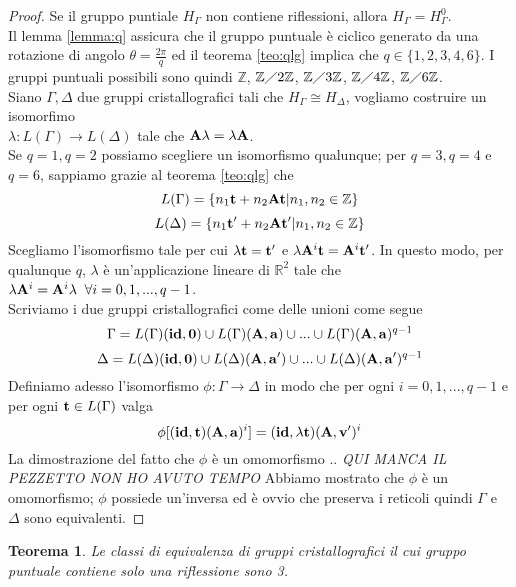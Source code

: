 \documentclass[a4paper,11pt,openright,twoside	]{book}
\newtheorem{theorem}{Teorema}[section]
\begin{document}
\begin{proof}
Se il gruppo puntiale $H_{\Gamma}$ non contiene riflessioni, allora $H_{\Gamma} = H_{\Gamma}^0$.\\
Il lemma \ref{lemma:q} assicura che il gruppo puntuale è ciclico generato da una rotazione di angolo $\theta = \frac{2 \pi}{q}$ ed il teorema \ref{teo:qlg} implica che $q \in \{ 1, 2, 3, 4, 6\}$. I gruppi puntuali possibili sono quindi $\mathbb{Z}$, $\mathbb{Z} \diagup 2 \mathbb{Z}$, $\mathbb{Z} \diagup 3 \mathbb{Z}$, $\mathbb{Z} \diagup 4 \mathbb{Z}$, $\mathbb{Z} \diagup 6 \mathbb{Z}$. \\
Siano $\Gamma, \Delta$ due gruppi cristallografici tali che $H_{\Gamma} \cong H_{\Delta}$, vogliamo costruire un isomorfimo \\
$\lambda: L(\Gamma) \longrightarrow L(\Delta)$ tale che $\vb{A} \lambda = \lambda \vb{A}$. \\
Se $q = 1, q=2$ possiamo scegliere un isomorfismo qualunque; per $q=3, q=4$ e $q=6$, sappiamo grazie al teorema \ref{teo:qlg} che 
\[ L(\Gamma) = \{ n_1 \vb{t} + n_2 \vb{A} \vb{t} | n_1, n_2 \in \mathbb{Z} \}\]
\[L(\Delta) = \{ n_1 \vb{t'} + n_2 \vb{A} \vb{t'} | n_1, n_2 \in \mathbb{Z} \} \]
Scegliamo l'isomorfismo tale per cui $\lambda \vb{t} = \vb{t'}$  e $\lambda \vb{A}^i \vb{t} = \vb{A}^i \vb{t'}$. 
In questo modo, per qualunque $q$, $\lambda$ è un'applicazione lineare di $\mathbb{R}^2$ tale che $\lambda \vb{A}^i =  \vb{A}^i \lambda \; \; \forall i = 0, 1,...,q-1$. \\
Scriviamo i due gruppi cristallografici come delle unioni come segue
\[ \Gamma = L(\Gamma)(\vb{id, 0}) \cup L(\Gamma)(\vb{A, a}) \cup ... \cup L(\Gamma)(\vb{A, a})^{q-1} \]
\[ \Delta = L(\Delta)(\vb{id, 0}) \cup L(\Delta)(\vb{A, a'}) \cup ... \cup L(\Delta)(\vb{A, a'})^{q-1} \]
Definiamo adesso l'isomorfismo $\phi : \Gamma \longrightarrow \Delta$ in modo che per ogni $i = 0, 1,...,q-1$ e per ogni $\vb{t} \in L(\Gamma)$ valga 
\[ \phi[(\vb{id, t})(\vb{A, a})^i] = (\vb{id}, \lambda\vb{t})(\vb{A, v'})^i \]
La dimostrazione del fatto che $\phi$ è un omomorfismo ..
\emph{QUI MANCA IL PEZZETTO NON HO AVUTO TEMPO}
Abbiamo mostrato che $\phi$ è un omomorfismo; $\phi$ possiede un'inversa ed è ovvio che preserva i reticoli quindi $\Gamma$ e $\Delta$ sono equivalenti.  
\end{proof}

\begin{theorem}
Le classi di equivalenza di gruppi cristallografici il cui gruppo puntuale contiene solo una riflessione sono 3.
\end{theorem}
\end{document}
